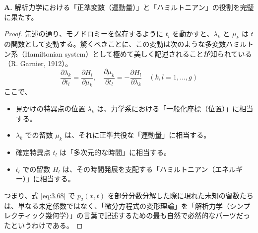 \begin{Q}
\textbf{A.} 解析力学における「正準変数（運動量）」と「ハミルトニアン」の役割を完璧に果たす。

\begin{proof}
先述の通り、モノドロミーを保存するように $t_l$ を動かすと、$\lambda_k$ と $\mu_k$ は $t$ の関数として変動する。驚くべきことに、この変動は次のような多変数ハミルトン系（Hamiltonian system）として極めて美しく記述されることが知られている（R. Garnier, 1912）。
\begin{equation}
\frac{\partial \lambda_k}{\partial t_l} = \frac{\partial H_l}{\partial \mu_k}, \quad \frac{\partial \mu_k}{\partial t_l} = -\frac{\partial H_l}{\partial \lambda_k} \quad (k, l = 1, \dots, g)
\end{equation}
ここで、
\begin{itemize}
    \item 見かけの特異点の位置 $\lambda_k$ は、力学系における「一般化座標（位置）」に相当する。
    \item $\lambda_k$ での留数 $\mu_k$ は、それに正準共役な「運動量」に相当する。
    \item 確定特異点 $t_l$ は「多次元的な時間」に相当する。
    \item $t_l$ での留数 $H_l$ は、その時間発展を支配する「ハミルトニアン（エネルギー）」に相当する。
\end{itemize}
つまり、式 \eqref{eq:3.68} で $p_2(x,t)$ を部分分数分解した際に現れた未知の留数たちは、単なる未定係数ではなく、「微分方程式の変形理論」を「解析力学（シンプレクティック幾何学）」の言葉で記述するための最も自然で必然的なパーツだったというわけである。
\end{proof}
\end{Q}
